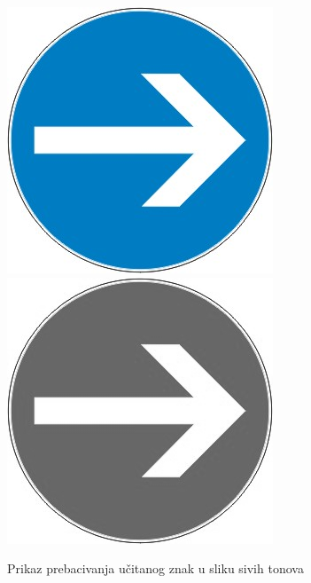 \begin{figure}[!htb]
\endminipage\hfill
{}
    \includegraphics[width=\linewidth]{figures/znak.png}
\endminipage\hfill
{}
\endminipage\hfill
{}
    \includegraphics[width=\linewidth]{figures/znakg.png}
\endminipage\hfill
{}
\endminipage\hfill
\caption{Prikaz prebacivanja učitanog znak u sliku sivih tonova}
\label{fig:lstR}
\end{figure}


